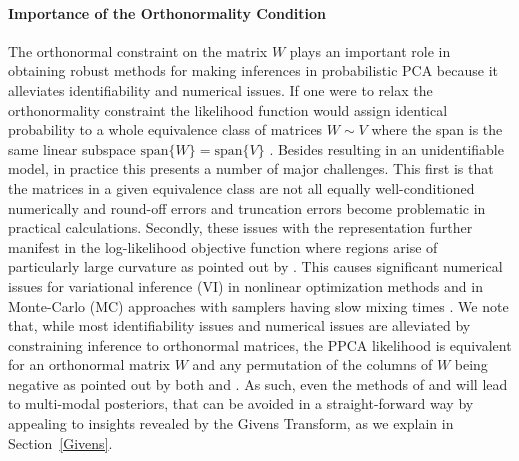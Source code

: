 \documentclass{article}
\begin{document}
\paragraph{Importance of the Orthonormality Condition}
The orthonormal constraint on the matrix $W$ plays an important role in obtaining robust methods for making inferences in probabilistic PCA because it alleviates identifiability and numerical issues.  If one were to relax the orthonormality constraint the likelihood function would assign identical probability to a whole equivalence class of matrices $W \sim V$ where the span is the same linear subspace $\mbox{span}\{W\} = \mbox{span}\{V\}$ \citet[chapt.~12.1.3]{murphy2012machine}.  Besides resulting in an unidentifiable model, in practice this presents a number of major challenges.  This first is that the matrices in a given equivalence class are not all equally well-conditioned numerically and round-off errors and truncation errors become problematic in practical calculations.  Secondly, these issues with the representation further manifest in the log-likelihood objective function where regions arise of particularly large curvature as pointed out by \citep{holbrook2016bayesian}.  This causes significant numerical issues for variational inference (VI) in nonlinear optimization methods and in Monte-Carlo (MC) approaches with samplers having slow mixing times \citep{holbrook2016bayesian}. We note that, while most identifiability issues and numerical issues are alleviated by constraining inference to orthonormal matrices, the PPCA likelihood is equivalent for an orthonormal matrix $W$ and any permutation of the columns of $W$ being negative as pointed out by both \citet[chapt.~12.1.3]{murphy2012machine} and  \citet{holbrook2016bayesian}. As such, even the methods of \citet{brubaker2012family} and \citet{byrne2013geodesic} will lead to multi-modal posteriors, that can be avoided in a straight-forward way by appealing to insights revealed by the Givens Transform, as we explain in Section~\ref{Givens}.

\end{document}
